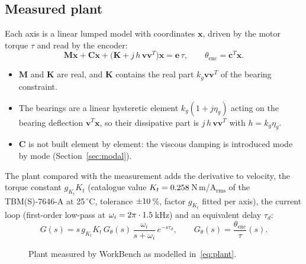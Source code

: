 \documentclass[10pt,a4paper]{article}
\numberwithin{equation}{section}
\begin{document}
\subsection{Measured plant}
Each axis is a linear lumped model with coordinates $\mathbf x$, driven by the motor torque $\tau$ and read by the encoder:
\begin{equation}
\mathbf M\ddot{\mathbf x}+\mathbf C\dot{\mathbf x}+\bigl(\mathbf K+j\,h\,\mathbf v\mathbf v^T\bigr)\mathbf x=\mathbf e\,\tau,\qquad \theta_\mathrm{enc}=\mathbf c^T\mathbf x .\label{eq:lumped}
\end{equation}
\begin{itemize}
\item $\mathbf M$ and $\mathbf K$ are real, and $\mathbf K$ contains the real part $k_g\mathbf v\mathbf v^T$ of the bearing constraint.
\item The bearings are a linear hysteretic element $k_g(1+j\eta_g)$ acting on the bearing deflection $\mathbf v^T\mathbf x$, so their dissipative part is $j\,h\,\mathbf v\mathbf v^T$ with $h=k_g\eta_g$.
\item $\mathbf C$ is not built element by element: the viscous damping is introduced mode by mode (Section~\ref{sec:modal}).
\end{itemize}
The plant compared with the measurement adds the derivative to velocity, the torque constant $g_{K_t}K_t$ (catalogue value $K_t=0.258$\,N\,m/A$_\mathrm{rms}$ of the TBM(S)-7646-A at 25\,$^\circ$C, tolerance $\pm10$\,\%, factor $g_{K_t}$ fitted per axis), the current loop (first-order low-pass at $\omega_i=2\pi\cdot1.5$\,kHz) and an equivalent delay $\tau_d$:
\begin{equation}
G(s)=s\,g_{K_t}K_t\,G_\theta(s)\,\frac{\omega_i}{s+\omega_i}\,e^{-s\tau_d},\qquad G_\theta(s)=\frac{\theta_\mathrm{enc}}{\tau}(s) .\label{eq:plant}
\end{equation}

\begin{figure}[H]\centering
{}
\caption{Plant measured by WorkBench as modelled in~\eqref{eq:plant}.}\label{fig:plant}
\end{figure}
\end{document}
